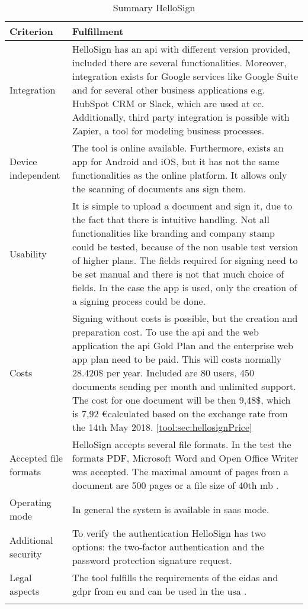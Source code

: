 	\begin{longtable}{|p{4cm}|p{10cm}|} \hline
		\rowcolor{Gray}Criterion & Fulfillment \\ \hline
		Integration & HelloSign has an \gls{api} with different version provided, included there are several functionalities. Moreover, integration exists for Google services like Google Suite and for several other business applications e.g. HubSpot CRM or Slack, which are used at \gls{cc}. Additionally, third party integration is possible with Zapier, a tool for modeling business processes. \parencite{hellosign2018integration,hellosign2018api}\\ \hline
		Device independent & The tool is online available. Furthermore, exists an \gls{app} for Android and iOS, but it has not the same functionalities as the online platform. It allows only the scanning of documents ans sign them. \parencite{hellosign2018legal}\\ \hline
		Usability & It is simple to upload a document and sign it, due to the fact that there is intuitive handling. Not all functionalities like branding and company stamp could be tested, because of the non usable test version of higher plans. The fields required for signing need to be set manual and there is not that much choice of fields. In the case the \gls{app} is used, only the creation of a signing process could be done.\\ \hline
		Costs &  Signing without costs is possible, but the creation and preparation cost. To use the \gls{api} and the web application the \gls{api} Gold Plan and the enterprise web app plan need to be paid. This will costs normally 28.420\$ per year. Included are 80 users, 450 documents sending per month and unlimited support. The cost for one document will be then 9,48\$, which is 7,92 \euro calculated based on the exchange rate from the 14th May 2018.  \ref{tool:sec:hellosignPrice} \\ \hline
		Accepted file formats & HelloSign accepts several file formats. In the test the formats \gls{PDF}, Microsoft Word and Open Office Writer was accepted. The maximal amount of pages from a document are 500 pages or a file size of 40th \gls{mb} \parencite{hellosign2018documents}.\\ \hline
		Operating mode & In general the system is available in \gls{saas} mode. \parencite{hellosign2018features} \\ \hline
		Additional security & To verify the authentication HelloSign has two options: the two-factor authentication and the password protection signature request.\parencite{hellosign2018security} \\ \hline
		Legal aspects & The tool fulfills the requirements of the \gls{eidas} and \gls{gdpr} from \gls{eu} and can be used in the \gls{usa} \parencite{hellosign2018legal,hellosign2018compliance}. \\ \hline
	\caption{Summary HelloSign}
	\label{tool:tab:hellosign}
	\end{longtable}

